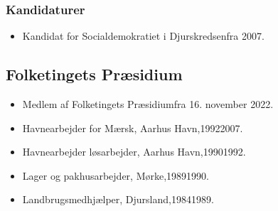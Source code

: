 \documentclass[11pt, a4paper]{awesome-cv}
\begin{document}
\begin{cvletter}
\subsubsection*{Kandidaturer}
\begin{itemize}
\item Kandidat for Socialdemokratiet i Djurskredsenfra 2007.
\end{itemize}
\subsection*{Folketingets Præsidium}
\begin{itemize}
\item Medlem af Folketingets Præsidiumfra 16. november 2022.
\end{itemize}
\begin{itemize}
\item Havnearbejder for Mærsk, Aarhus Havn,19922007.
\item Havnearbejder løsarbejder, Aarhus Havn,19901992.
\item Lager og pakhusarbejder, Mørke,19891990.
\item Landbrugsmedhjælper, Djursland,19841989.
\end{itemize}
\end{cvletter}
\end{document}
